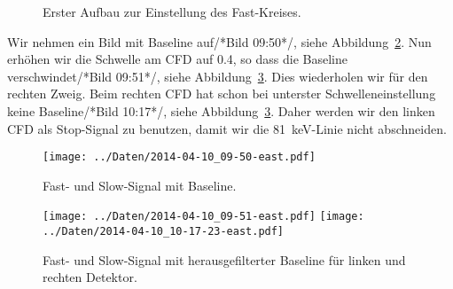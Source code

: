 \begin{figure}[htbp]
    \centering
    \caption{%
        Erster Aufbau zur Einstellung des Fast-Kreises.
    }
    \label{fig:aufbau:fast1}
\end{figure}

Wir nehmen ein Bild mit Baseline auf/*Bild 09:50*/, siehe
Abbildung~\ref{fig:cfd_einstellen_baseline}. Nun erhöhen wir die Schwelle am
CFD auf \num{0.4}, so dass die Baseline verschwindet/*Bild 09:51*/, siehe
Abbildung~\ref{fig:cfd_einstellen}. Dies wiederholen wir für den rechten Zweig.
Beim rechten CFD hat schon bei unterster Schwelleneinstellung keine
Baseline/*Bild 10:17*/, siehe Abbildung~\ref{fig:cfd_einstellen}. Daher werden
wir den linken CFD als Stop-Signal zu benutzen, damit wir die
\SI{81}{\kilo\electronvolt}-Linie nicht abschneiden.

\begin{figure}[htbp]
    \centering
    \texttt{[image: ../Daten/2014-04-10\_09-50-east.pdf]}
    \caption{%
        Fast- und Slow-Signal mit Baseline.
    }
    \label{fig:cfd_einstellen_baseline}
\end{figure}

\begin{figure}[htbp]
    \centering
    \texttt{[image: ../Daten/2014-04-10\_09-51-east.pdf]}
    \hfill
    \texttt{[image: ../Daten/2014-04-10\_10-17-23-east.pdf]}
    \caption{%
        Fast- und Slow-Signal mit herausgefilterter Baseline für linken und
        rechten Detektor.
    }
    \label{fig:cfd_einstellen}
\end{figure}

